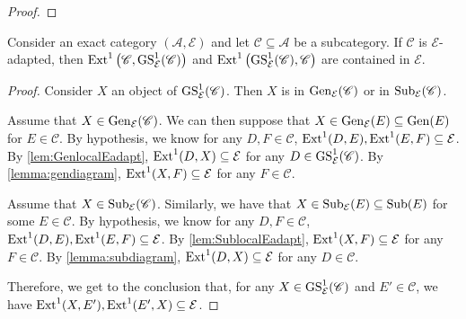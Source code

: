 \begin{proof}

\end{proof}

\begin{prop}
\label{prop:Estableinduction}
Consider an exact category $(\mathscr{A}, \mathcal{E})$ and let $\mathscr{C} \subseteq \mathscr{A}$ be a subcategory. If $\mathscr{C}$ is $ {\mathcal{E}}$-adapted, then $\operatorname{Ext}^1\left(\mathscr{C}, \operatorname{GS}^1_{\mathcal{E}}(\mathscr{C})\right)$ and $\operatorname{Ext}^1 \left(\operatorname{GS}^1_{\mathcal{E}}(\mathscr{C}), \mathscr{C} \right)$ are contained in ${\mathcal{E}}$.
\end{prop}

\begin{proof}
Consider $X$ an object of $\operatorname{GS}^1_{\mathcal{E}}(\mathscr{C})$. Then $X$ is in $\operatorname{Gen}_{\mathcal{E}}(\mathscr{C})$ or in $\operatorname{Sub}_{\mathcal{E}}(\mathscr{C})$.

Assume that $X \in \operatorname{Gen}_{\mathcal{E}}(\mathscr{C})$. We can then suppose that $X \in \operatorname{Gen}_{\mathcal{E}}(E) \subseteq \operatorname{Gen}(E)$ for $E \in \mathscr{C}$. By hypothesis, we know for any $D,F\in \mathscr{C}$, $\operatorname{Ext}^1(D,E),\operatorname{Ext}^1(E,F) \subseteq \mathcal{E}$. By \cref{lem:GenlocalEadapt}, $\operatorname{Ext}^1(D,X) \subseteq \mathcal{E}$ for any $D \in \operatorname{GS}^{1}_{\mathcal{E}}(\mathscr{C})$. By \cref{lemma:gendiagram}, $\operatorname{Ext}^1(X,F) \subseteq \mathcal{E}$ for any $F \in \mathscr{C}$.

Assume that $X \in \operatorname{Sub}_{\mathcal{E}}(\mathscr{C})$. Similarly, we have that $X \in \operatorname{Sub}_{\mathcal{E}}(E) \subseteq \operatorname{Sub}(E)$ for some $E \in \mathscr{C}$. By hypothesis, we know for any $D,F \in \mathscr{C}$, $\operatorname{Ext}^1(D,E),\operatorname{Ext}^1(E,F) \subseteq \mathcal{E}$. By \cref{lem:SublocalEadapt}, $\operatorname{Ext}^1(X,F) \subseteq \mathcal{E}$ for any $F \in \mathscr{C}$. By \cref{lemma:subdiagram}, $\operatorname{Ext}^1(D,X) \subseteq \mathcal{E}$ for any $D \in \mathscr{C}$.

Therefore, we get to the conclusion that, for any $X\in \operatorname{GS}^1_{\mathcal{E}}(\mathscr{C})$ and $E' \in \mathscr{C}$, we have $\operatorname{Ext}^1(X,E'),\operatorname{Ext}^1(E',X)\subseteq \mathcal{E}$.
\end{proof}

